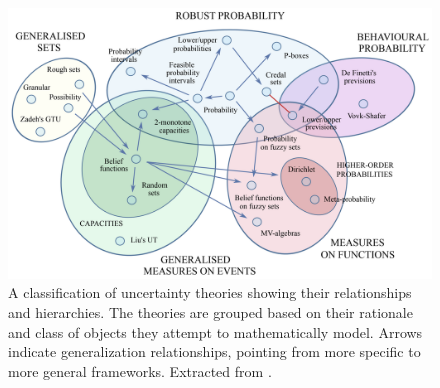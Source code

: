\begin{figure}[ht]
    \includegraphics[width=\textwidth]{ch0/figures/Uncertainties Diagram.png}
    \caption{A classification of uncertainty theories showing their relationships and hierarchies. The theories are grouped based on their rationale and class of objects they attempt to mathematically model. Arrows indicate generalization relationships, pointing from more specific to more general frameworks. Extracted from \cite{uncertaintymeasuresbigpicture}.}
    \label{fig:uncertainty_taxonomy}
\end{figure}











































